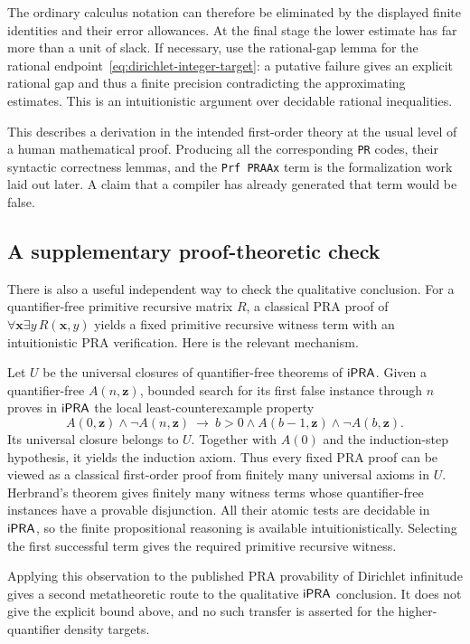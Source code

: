 The ordinary calculus notation can therefore be eliminated by the displayed finite identities and their error allowances. At the final stage the lower estimate has far more than a unit of slack. If necessary, use the rational-gap lemma for the rational endpoint~\eqref{eq:dirichlet-integer-target}: a putative failure gives an explicit rational gap and thus a finite precision contradicting the approximating estimates. This is an intuitionistic argument over decidable rational inequalities.

This describes a derivation in the intended first-order theory at the usual level of a human mathematical proof. Producing all the corresponding \texttt{PR} codes, their syntactic correctness lemmas, and the \texttt{Prf PRAAx} term is the formalization work laid out later. A claim that a compiler has already generated that term would be false.

\subsection{A supplementary proof-theoretic check}

There is also a useful independent way to check the qualitative conclusion. For a quantifier-free primitive recursive matrix $R$, a classical PRA proof of $\forall\mathbf x\exists y\,R(\mathbf x,y)$ yields a fixed primitive recursive witness term with an intuitionistic PRA verification. Here is the relevant mechanism.

Let $U$ be the universal closures of quantifier-free theorems of $\mathsf{iPRA}$. Given a quantifier-free $A(n,\mathbf z)$, bounded search for its first false instance through $n$ proves in $\mathsf{iPRA}$ the local least-counterexample property
\[
 A(0,\mathbf z)\land\neg A(n,\mathbf z)
 \ \longrightarrow\ b>0\land A(b-1,\mathbf z)\land\neg A(b,\mathbf z).
\]
Its universal closure belongs to $U$. Together with $A(0)$ and the induction-step hypothesis, it yields the induction axiom. Thus every fixed PRA proof can be viewed as a classical first-order proof from finitely many universal axioms in $U$. Herbrand's theorem gives finitely many witness terms whose quantifier-free instances have a provable disjunction. All their atomic tests are decidable in $\mathsf{iPRA}$, so the finite propositional reasoning is available intuitionistically. Selecting the first successful term gives the required primitive recursive witness.

Applying this observation to the published PRA provability of Dirichlet infinitude gives a second metatheoretic route to the qualitative $\mathsf{iPRA}$ conclusion. It does not give the explicit bound above, and no such transfer is asserted for the higher-quantifier density targets.

